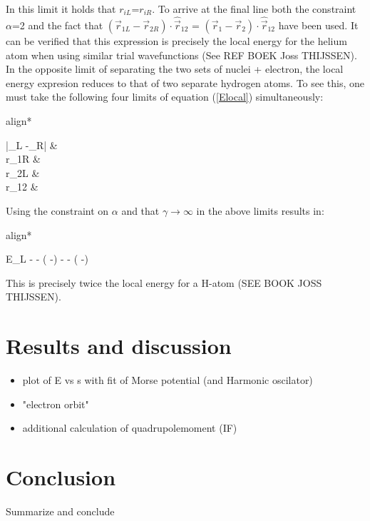 \documentclass[a4paper,10pt]{article}
\begin{document}
In this limit it holds that $r_{iL}$=$r_{iR}$. To arrive at the final line both the constraint $\alpha$=2 and the fact that $(\vec{r}_{1L} -\vec{r}_{2R})\cdot \hat\vec{r}_{12}$ = $(\vec{r}_1 -\vec{r}_2) \cdot \hat{\vec{r}}_{12}$ have been used.
It can be verified that this expression is precisely the local energy for the helium atom when using similar trial wavefunctions (See REF BOEK Joss THIJSSEN). \\
In the opposite limit of separating the two sets of nuclei + electron, the local energy expresion reduces to that of two separate hydrogen atoms.  To see this, one must take the following four limits of equation (\ref{Elocal}) simultaneously:
	\begin{empheq}[box=\fbox]{align*}
	\begin{split}
	|_{L} -_{R}|  &\rightarrow \infty \\
	r_{1R} &\rightarrow \infty \\
	r_{2L} &\rightarrow \infty \\
	r_{12} &\rightarrow \infty
	\end{split}
	\end{empheq}
Using the constraint on $\alpha$ and that $\gamma \rightarrow \infty$ in the above limits results in:	
	\begin{empheq}[box=\fbox]{align*}
	\begin{split}
	E_{L} \rightarrow - -  ( -) - -  ( -)  \\
	\end{split}
	\end{empheq}
This is precisely twice the local energy for a H-atom (SEE BOOK JOSS THIJSSEN). 





\section{Results and discussion} 
	\begin{itemize}
	\item plot of E vs s with fit of Morse potential (and Harmonic oscilator)
	\item "electron orbit" 
	\item additional calculation of quadrupolemoment (IF)
	\end{itemize}

 
\section{Conclusion}
	Summarize and conclude 
	
\end{document}
